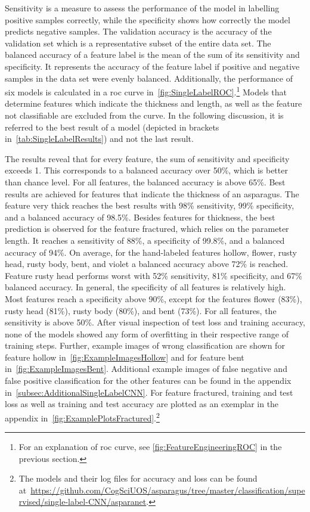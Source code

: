 Sensitivity is a measure to assess the performance of the model in labelling positive samples correctly, while the specificity shows how correctly the model predicts negative samples. The validation accuracy is the accuracy of the validation set which is a representative subset of the entire data set. The balanced accuracy of a feature label is the mean of the sum of its sensitivity and specificity. It represents the accuracy of the feature label if positive and negative samples in the data set were evenly balanced.
Additionally, the performance of six models is calculated in a \acrshort{roc} curve in~\autoref{fig:SingleLabelROC}.\footnote{For an explanation of \acrshort{roc} curve, see \autoref{fig:FeatureEngineeringROC} in the previous section.} Models that determine features which indicate the thickness and length, as well as the feature not classifiable are excluded from the curve.
In the following discussion, it is referred to the best result of a model (depicted in brackets in~\autoref{tab:SingleLabelResults}) and not the last result.

The results reveal that for every feature, the sum of sensitivity and specificity exceeds 1.  This corresponds to a balanced accuracy over 50\%, which is better than chance level. For all features, the balanced accuracy is above 65\%. Best results are achieved for features that indicate the thickness of an asparagus. The feature very thick reaches the best results with 98\% sensitivity, 99\% specificity, and a balanced accuracy of 98.5\%. Besides features for thickness, the best prediction is observed for the feature fractured, which relies on the parameter length. It reaches a sensitivity of 88\%, a specificity of 99.8\%, and a balanced accuracy of 94\%.
On average, for the hand-labeled features hollow, flower, rusty head, rusty body, bent, and violet a balanced accuracy above 72\% is reached. Feature rusty head performs worst with 52\% sensitivity, 81\% specificity, and 67\% balanced accuracy. In general, the specificity of all features is relatively high. Most features reach a specificity above 90\%, except for the features flower (83\%), rusty head (81\%), rusty body (80\%), and bent (73\%). For all features, the sensitivity is above 50\%. After visual inspection of test loss and training accuracy, none of the models showed any form of overfitting in their respective range of training steps.
Further, example images of wrong classification are shown for feature hollow in~\autoref{fig:ExampleImagesHollow} and for feature bent in~\autoref{fig:ExampleImagesBent}. Additional example images of false negative and false positive classification for the other features can be found in the appendix in~\autoref{subsec:AdditionalSingleLabelCNN}. For feature fractured, training and test loss as well as training and test accuracy are plotted as an exemplar in the appendix in~\autoref{fig:ExamplePlotsFractured}.\footnote{The models and their log files for accuracy and loss can be found at~\url{https://github.com/CogSciUOS/asparagus/tree/master/classification/supervised/single-label-CNN/asparanet}.}
 

